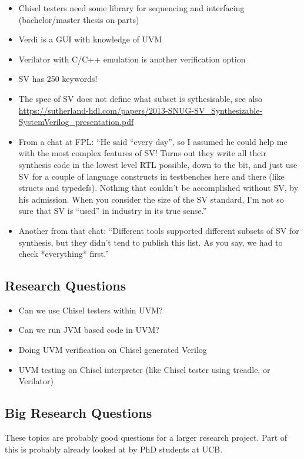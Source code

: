 \documentclass[conference]{IEEEtran}
\begin{document}
\begin{itemize}
\item Chisel testers need some library for sequencing and interfacing (bachelor/master thesis on parts)
\item Verdi is a GUI with knowledge of UVM
\item Verilator with C/C++ emulation is another verification option
\item SV has 250 keywords!
\item The spec of SV does not define what subset is sythesisable, see also \url{https://sutherland-hdl.com/papers/2013-SNUG-SV_Synthesizable-SystemVerilog_presentation.pdf}
\item From a chat at FPL: ``He said ``every day'', so I assumed he could help me with the most complex features of SV! Turns out they write all their synthesis code in the lowest level RTL possible, down to the bit, and just use SV for a couple of language constructs in testbenches here and there (like structs and typedefs). Nothing that couldn't be accomplished without SV, by his admission. When you consider the size of the SV standard, I'm not so sure that SV is ``used'' in industry in its true sense.''
\item Another from that chat: ``Different tools supported different subsets of SV for synthesis, but they didn't tend to publish this list. As you say, we had to check *everything* first.''
\end{itemize}

\subsection{Research Questions}

\begin{itemize}
\item Can we use Chisel testers within UVM?
\item Can we run JVM based code in UVM?
\item Doing UVM verification on Chisel generated Verilog
\item UVM testing on Chisel interpreter (like Chisel tester using treadle, or Verilator)
\end{itemize}

\subsection{Big Research Questions}

These topics are probably good questions for a larger research project.
Part of this is probably already looked at by PhD students at UCB.
\end{document}
